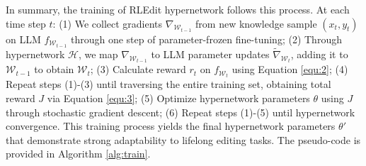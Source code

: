 In summary, the training of RLEdit hypernetwork follows this process. At each time step $t$: (1) We collect gradients $\nabla_{\mathcal{W}_{t-1}}$ from new knowledge sample $(x_t,y_t)$ on LLM $f_{\mathcal{W}_{t-1}}$ through one step of parameter-frozen fine-tuning; (2) Through hypernetwork $\mathcal{H}$, we map $\nabla_{\mathcal{W}_{t-1}}$ to LLM parameter updates $\tilde{\nabla}_{\mathcal{W}_t}$, adding it to $\mathcal{W}_{t-1}$ to obtain $\mathcal{W}_{t}$; (3) Calculate reward $r_t$ on $f_{\mathcal{W}_{t}}$ using Equation \ref{equ:2}; (4) Repeat steps (1)-(3) until traversing the entire training set, obtaining total reward $J$ via Equation \ref{equ:3}; (5) Optimize hypernetwork parameters $\theta$ using $J$ through stochastic gradient descent; (6) Repeat steps (1)-(5) until hypernetwork convergence. This training process yields the final hypernetwork parameters $\theta'$ that demonstrate strong adaptability to lifelong editing tasks. The pseudo-code is provided in Algorithm \ref{alg:train}. 


